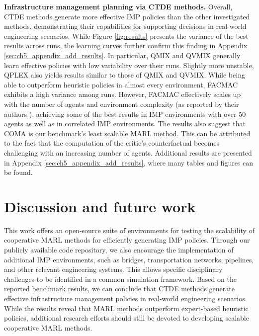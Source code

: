 \textbf{Infrastructure management planning via CTDE methods.}
Overall, CTDE methods generate more effective IMP policies than the other investigated methods, demonstrating their capabilities for supporting decisions in real-world engineering scenarios.
While Figure \ref{fig:results} presents the variance of the best results across runs, the learning curves further confirm this finding in Appendix \ref{sec:ch5_appendix_add_results}.
In particular, QMIX and QVMIX generally learn effective policies with low variability over their runs. 
Slightly more unstable, QPLEX also yields results similar to those of QMIX and QVMIX.
While being able to outperform heuristic policies in almost every environment, FACMAC exhibits a high variance among runs.
However, FACMAC effectively scales up with the number of agents and environment complexity (as reported by their authors \citep{peng2021facmac}), achieving some of the best results in IMP environments with over 50 agents as well as in correlated IMP environments.
The results also suggest that COMA is our benchmark's least scalable MARL method.
This can be attributed to the fact that the computation of the critic's counterfactual becomes challenging with an increasing number of agents.
Additional results are presented in Appendix \ref{sec:ch5_appendix_add_results}, where many tables and figures can be found.

\section{Discussion and future work}\label{sec:ch5_discusconclu}
This work offers an open-source suite of environments for testing the scalability of cooperative MARL methods for efficiently generating IMP policies.
Through our publicly available code repository, we also encourage the implementation of additional IMP environments, such as bridges, transportation networks, pipelines, and other relevant engineering systems.
This allows specific disciplinary challenges to be identified in a common simulation framework.
Based on the reported benchmark results, we can conclude that CTDE methods generate effective infrastructure management policies in real-world engineering scenarios.
While the results reveal that MARL methods outperform expert-based heuristic policies, additional research efforts should still be devoted to developing scalable cooperative MARL methods.

